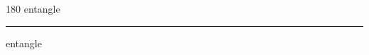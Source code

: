 
\begin{frame}
\begin{center}
\begin{turn}{180}
{\fontsize{2.5cm}{1em}\selectfont entangle}
\end{turn}
\vspace{1em}\par  
\hrule
\vspace{1em}\par  
{\fontsize{2.5cm}{1em}\selectfont entangle}
\end{center}
\end{frame}
